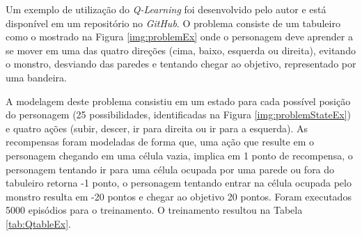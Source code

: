 Um exemplo de utilização do \textit{Q-Learning} foi desenvolvido pelo autor e está disponível em um
repositório no \textit{GitHub}. O problema consiste de um tabuleiro
como o mostrado na Figura \ref{img:problemEx} onde o personagem deve aprender a se mover em uma das
quatro direções (cima, baixo, esquerda ou direita), evitando o monstro, desviando das paredes e
tentando chegar ao objetivo, representado por uma bandeira.


A modelagem deste problema consistiu em um estado para cada possível posição do personagem (25
possibilidades, identificadas na Figura \ref{img:problemStateEx}) e quatro ações (subir, descer, ir
para direita ou ir para a esquerda). As recompensas foram modeladas de forma que, uma ação que
resulte em o personagem chegando em uma célula vazia, implica em 1 ponto de recompensa, o personagem
tentando ir para uma célula ocupada por uma parede ou fora do tabuleiro retorna -1 ponto, o
personagem tentando entrar na célula ocupada pelo monstro resulta em -20 pontos e chegar ao objetivo
20 pontos. Foram executados 5000 episódios para o treinamento. O treinamento resultou na Tabela
\ref{tab:QtableEx}.

